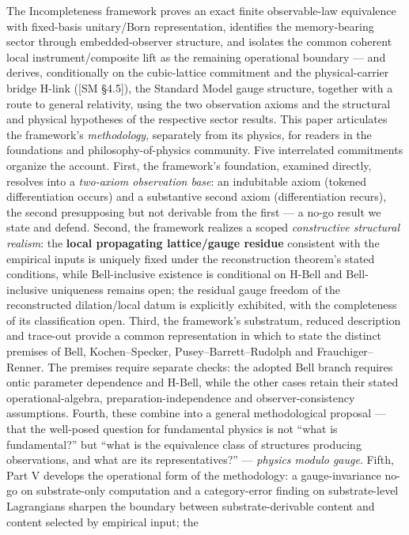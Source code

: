 \documentclass[
]{article}
\begin{document}
The Incompleteness framework proves an exact finite observable-law
equivalence with fixed-basis unitary/Born representation, identifies the
memory-bearing sector through embedded-observer structure, and isolates
the common coherent local instrument/composite lift as the remaining
operational boundary --- and derives, conditionally on the cubic-lattice
commitment and the physical-carrier bridge H-link ({[}SM §4.5{]}), the
Standard Model gauge structure, together with a route to general
relativity, using the two observation axioms and the structural and
physical hypotheses of the respective sector results. This paper
articulates the framework's \emph{methodology}, separately from its
physics, for readers in the foundations and philosophy-of-physics
community. Five interrelated commitments organize the account. First,
the framework's foundation, examined directly, resolves into a
\emph{two-axiom observation base}: an indubitable axiom (tokened
differentiation occurs) and a substantive second axiom (differentiation
recurs), the second presupposing but not derivable from the first --- a
no-go result we state and defend. Second, the framework realizes a
scoped \emph{constructive structural realism}: the \textbf{local
propagating lattice/gauge residue} consistent with the empirical inputs
is uniquely fixed under the reconstruction theorem's stated conditions,
while Bell-inclusive existence is conditional on H-Bell and
Bell-inclusive uniqueness remains open; the residual gauge freedom of
the reconstructed dilation/local datum is explicitly exhibited, with the
completeness of its classification open. Third, the framework's
substratum, reduced description and trace-out provide a common
representation in which to state the distinct premises of Bell,
Kochen--Specker, Pusey--Barrett--Rudolph and Frauchiger--Renner. The
premises require separate checks: the adopted Bell branch requires ontic
parameter dependence and H-Bell, while the other cases retain their
stated operational-algebra, preparation-independence and
observer-consistency assumptions. Fourth, these combine into a general
methodological proposal --- that the well-posed question for fundamental
physics is not ``what is fundamental?'' but ``what is the equivalence
class of structures producing observations, and what are its
representatives?'' --- \emph{physics modulo gauge}. Fifth, Part V
develops the operational form of the methodology: a gauge-invariance
no-go on substrate-only computation and a category-error finding on
substrate-level Lagrangians sharpen the boundary between
substrate-derivable content and content selected by empirical input; the
\end{document}
